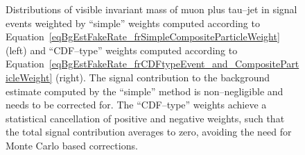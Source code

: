 \begin{figure}[t]
\begin{center}
\caption[Comparison of fake--rate contribution from genuine taus in the simple
and CDF methods]{\captiontext Distributions of visible invariant mass of muon
plus tau--jet in \ZTT signal events weighted by ``simple'' weights computed
according to Equation~\ref{eqBgEstFakeRate_frSimpleCompositeParticleWeight}
(left) and ``CDF--type'' weights computed according to
Equation~\ref{eqBgEstFakeRate_frCDFtypeEvent_and_CompositeParticleWeight}
(right).  The signal contribution to the background estimate computed by the
``simple'' method is non--negligible and needs to be corrected for.  The
``CDF--type'' weights achieve a statistical cancellation of positive and
negative weights, such that the total signal contribution averages to zero,
avoiding the need for Monte Carlo based corrections.}
\label{figBgEstFakeRate_frCDFtypeResults_mVisibleSignal}
\end{center}
\end{figure} 

